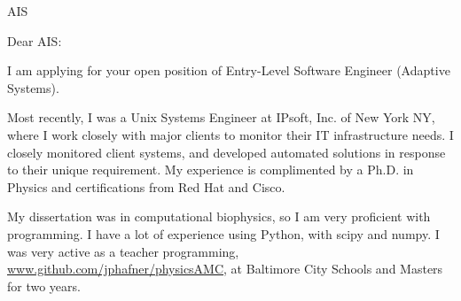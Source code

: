 \documentclass[
    jphafner,
    fontsize=11pt,
    foldmarks=false,
    pagenumber=false,
    addrfield=true,
]{scrlttr2}
\date{\today}
\begin{document}
\begin{letter}{AIS}
    \opening{Dear AIS:}

    I am applying for your open position of Entry-Level Software Engineer (Adaptive Systems).



    
 Most recently, I was a Unix Systems Engineer at IPsoft, Inc. of New York NY,
    where I work closely with major clients to monitor their IT infrastructure needs. 
    I closely monitored client systems, and developed automated solutions in response to their unique requirement.
    My experience is complimented by a Ph.D. in Physics and certifications from Red Hat and Cisco.

My dissertation was in computational biophysics, so I am very proficient with programming.
    I have a lot of experience using Python, with scipy and numpy.
    I was very active as a teacher programming, \url{www.github.com/jphafner/physicsAMC},
        at Baltimore City Schools and Masters for two years.



\end{letter}
\end{document}
